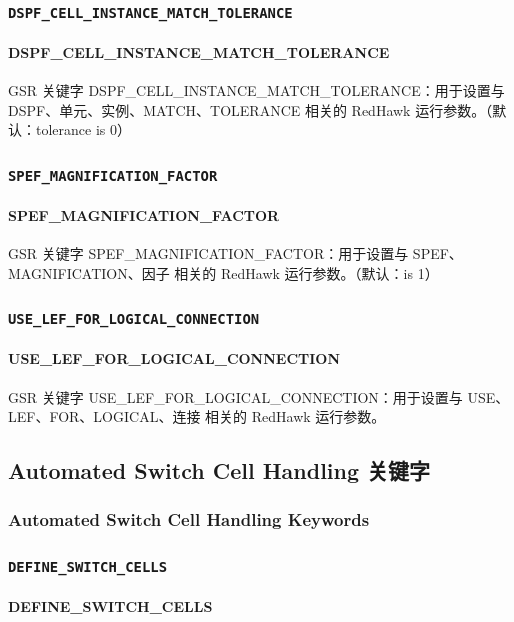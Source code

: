 \subsubsection{\texttt{DSPF_CELL_INSTANCE_MATCH_TOLERANCE}}
\paragraph*{DSPF_CELL_INSTANCE_MATCH_TOLERANCE}

GSR 关键字 DSPF_CELL_INSTANCE_MATCH_TOLERANCE：用于设置与 DSPF、单元、实例、MATCH、TOLERANCE 相关的 RedHawk 运行参数。（默认：tolerance is 0）

\subsubsection{\texttt{SPEF_MAGNIFICATION_FACTOR}}
\paragraph*{SPEF_MAGNIFICATION_FACTOR}

GSR 关键字 SPEF_MAGNIFICATION_FACTOR：用于设置与 SPEF、MAGNIFICATION、因子 相关的 RedHawk 运行参数。（默认：is 1）

\subsubsection{\texttt{USE_LEF_FOR_LOGICAL_CONNECTION}}
\paragraph*{USE_LEF_FOR_LOGICAL_CONNECTION}

GSR 关键字 USE_LEF_FOR_LOGICAL_CONNECTION：用于设置与 USE、LEF、FOR、LOGICAL、连接 相关的 RedHawk 运行参数。

\subsection{Automated Switch Cell Handling 关键字}
\subsubsection*{Automated Switch Cell Handling Keywords}

\subsubsection{\texttt{DEFINE_SWITCH_CELLS}}
\paragraph*{DEFINE_SWITCH_CELLS}

